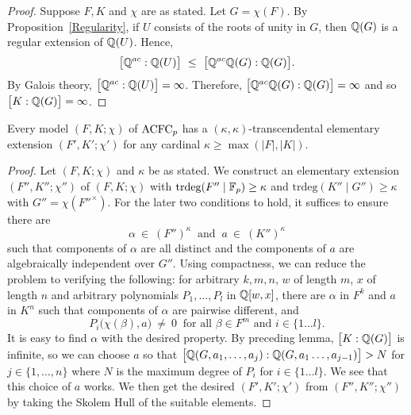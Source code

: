 \begin{proof}
Suppose $F, K$ and $\chi$ are as stated. Let $G= \chi( F)$. By Proposition~\ref{Regularity}, if $U$ consists of the roots of unity in $G$, then $\mathbb{Q}(G)$ is a regular extension of $\mathbb{Q}(U)$. Hence, 
$$\big[\mathbb{Q}^{ac}:\mathbb{Q}(U)\big]\ \leq\ \big[\mathbb{Q}^{ac}\mathbb{Q}(G): \mathbb{Q}(G) \big].$$ By Galois theory, $\big[\mathbb{Q}^{ac}:\mathbb{Q}(U)\big] = \infty$. Therefore, $\big[\mathbb{Q}^{ac}\mathbb{Q}(G): \mathbb{Q}(G)\big]= \infty$ and so $\big[K: \mathbb{Q}(G)\big]= \infty$.
\end{proof}












\begin{lem} \label{KappaExt}
Every model $(F, K; \chi)$ of $\mathrm{ACFC}_p$  has a $(\kappa ,\kappa)$-transcendental elementary extension $(F', K'; \chi')$ for any cardinal $\kappa \geq \max(|F|, |K|)$.
\end{lem}

\begin{proof}
Let $(F, K; \chi)$ and $\kappa$ be as stated.
We construct an elementary extension $(F'', K''; \chi'')$ of $(F, K; \chi)$ with $\text{trdeg}(F''\mid \mathbb{F}_p) \geq \kappa$ and $\text{trdeg}(K''\mid G'') \geq \kappa$ with $G'' = \chi({F''}^\times)$.
For the later two conditions to hold, it suffices to ensure there are $$\alpha\ \in\ (F'')^\kappa\ \text{ and }\ a\ \in\ (K'')^\kappa$$ such that components of $\alpha$ are all distinct and the components of $a$ are algebraically independent over $G''$. 
Using compactness, we can reduce the problem to verifying the following: for arbitrary $k,m,n$, $w$  of length $m$, $x$ of length $n$ and arbitrary polynomials $P_1, \ldots, P_l $ in $\mathbb{Q}[w,x]$, there are $\alpha$ in $F^k$ and $a$ in $K^n$ such that components of $\alpha$ are pairwise different, and
$$P_i\big(\chi(\beta), a\big)\ \neq\ 0\ \text{ for all } \beta \in F^m \text{ and } i \in \{1 \ldots l\}.$$
It is easy to find $\alpha$ with the desired property. By preceding lemma, $ \big[K: \mathbb{Q}(G)\big]$ is infinite, so we can choose  $a$ so that $\big[\mathbb{Q}(G, a_1, \ldots, a_j): \mathbb{Q}(G, a_1 \ldots,a_{j-1})\big]>N$ for $j \in \{ 1, \ldots, n\}$ where $N$ is the maximum degree of $P_i$ for $ i \in \{1 \ldots l\} $.
We see that this choice of $a$ works. We then get the desired $(F', K'; \chi')$ from $(F'', K''; \chi'')$ by taking the Skolem Hull of the suitable elements.
\end{proof}

